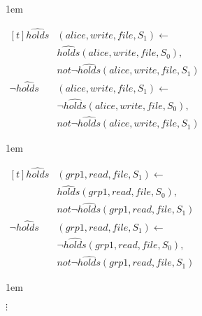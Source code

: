 \documentclass[global,twocolumn,final]{svjour}
\newenvironment{vexample}
  {\begin{example}\hspace{0.25em}}
  {\end{example}}
\newenvironment{vquote}
  {\begin{list}{}{\leftmargin 1em}\item[]}
  {\end{list}}
\begin{document}
\begin{vexample}
\begin{enumerate}
              \begin{vquote}
                \begin{math}
                  \begin{aligned}[t]
                    \hat{holds}&(alice, write, file, S_{1}) \leftarrow \\
                    & \hat{holds}(alice, write, file, S_{0}), \\
                    & not \lnot \hat{holds}(alice, write, file, S_{1}) \\
                    \lnot \hat{holds}&(alice, write, file, S_{1}) \leftarrow \\
                    & \lnot \hat{holds}(alice, write, file, S_{0}), \\
                    & not \lnot \hat{holds}(alice, write, file, S_{1})
                  \end{aligned}
                \end{math}
              \end{vquote}

              \begin{vquote}
                \begin{math}
                  \begin{aligned}[t]
                    \hat{holds}&(grp1, read, file, S_{1}) \leftarrow \\
                    & \hat{holds}(grp1, read, file, S_{0}), \\
                    & not \lnot \hat{holds}(grp1, read, file, S_{1}) \\
                    \lnot \hat{holds}&(grp1, read, file, S_{1}) \leftarrow \\
                    & \lnot \hat{holds}(grp1, read, file, S_{0}), \\
                    & not \lnot \hat{holds}(grp1, read, file, S_{1})
                  \end{aligned}
                \end{math}
              \end{vquote}

              \begin{vquote}
                \hspace{5em}$\vdots$
              \end{vquote}


\end{enumerate}
\end{vexample}
\end{document}
